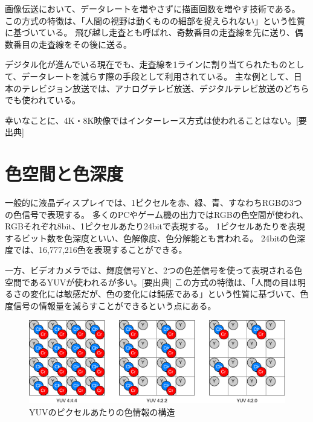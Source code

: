 画像伝送において、データレートを増やさずに描画回数を増やす技術である。
この方式の特徴は、「人間の視野は動くものの細部を捉えられない」という性質に基づいている。
飛び越し走査とも呼ばれ、奇数番目の走査線を先に送り、偶数番目の走査線をその後に送る。

デジタル化が進んでいる現在でも、走査線を1ラインに割り当てられたものとして、データレートを減らす際の手段として利用されている。
主な例として、日本のテレビジョン放送では、アナログテレビ放送、デジタルテレビ放送のどちらでも使われている。

幸いなことに、4K・8K映像ではインターレース方式は使われることはない。[要出典]

\section{色空間と色深度}
\label{sec:colorspace}

一般的に液晶ディスプレイでは、1ピクセルを赤、緑、青、すなわちRGBの3つの色信号で表現する。
多くのPCやゲーム機の出力ではRGBの色空間が使われ、RGBそれぞれ8bit、1ピクセルあたり24bitで表現する。
1ピクセルあたりを表現するビット数を色深度といい、色解像度、色分解能とも言われる。
24bitの色深度では、16,777,216色を表現することができる。

一方、ビデオカメラでは、輝度信号Yと、2つの色差信号を使って表現される色空間であるYUVが使われるが多い。[要出典]
この方式の特徴は、「人間の目は明るさの変化には敏感だが、色の変化には鈍感である」という性質に基づいて、色度信号の情報量を減らすことができるという点にある。

\begin{figure}[htbp]
    \begin{center}
        \includegraphics[bb=0 0 681 222,width=14cm]{img/yuv-pixel-structure.pdf}
    \end{center}
    \caption{YUVのピクセルあたりの色情報の構造}
    \label{fig:yuv-pixel-structure}
\end{figure}


